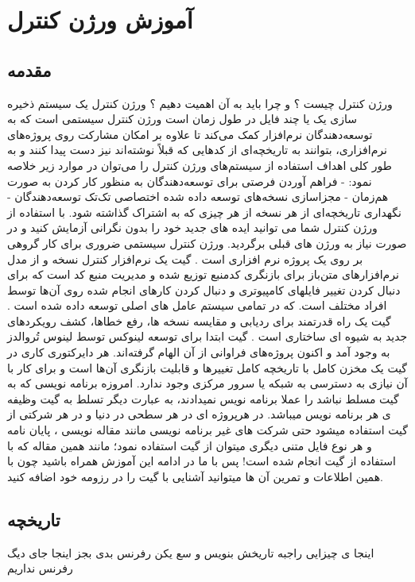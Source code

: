 \chapter{آموزش ورژن کنترل}




\section{مقدمه}
ورژن کنترل چیست ؟ و چرا باید به آن اهمیت دهیم ؟ ورژن کنترل یک سیستم ذخیره سازی یک یا چند فایل در طول زمان است \cite{Blischak2016} ورژن کنترل سیستمی است که به توسعه‌دهندگان نرم‌افزار کمک می‌کند تا علاوه بر امکان مشارکت روی پروژه‌های نرم‌افزاری، بتوانند به تاریخچه‌ای از کدهایی که قبلاً نوشته‌اند نیز دست پیدا کنند و به طور کلی اهداف استفاده از سیستم‌های ورژن کنترل را می‌توان در موارد زیر خلاصه نمود:
- فراهم آوردن فرصتی برای توسعه‌دهندگان به منظور کار کردن به صورت هم‌زمان 
- مجزاسازی نسخه‌های توسعه داده شده اختصاصی تک‌تک توسعه‌دهندگان 
- نگهداری تاریخچه‌ای از هر نسخه از هر چیزی که به اشتراک گذاشته شود.
با استفاده از ورژن کنترل شما می توانید ایده های جدید خود را بدون نگرانی آزمایش کنید و در صورت نیاز به ورژن های قبلی برگردید\cite{Chacon2014}. ورژن کنترل سیستمی ضروری برای کار گروهی بر روی یک پروژه نرم افزاری است \cite{DeAlwis2009} . 
گیت یک نرم‌افزار کنترل نسخه و از مدل نرم‌افزارهای متن‌باز برای بازنگری کدمنبع توزیع شده و مدیریت منبع کد است که برای دنبال کردن تغییر فایلهای کامپیوتری و دنبال کردن کارهای انجام شده روی آن‌ها توسط افراد مختلف است. که در تمامی سیستم عامل های اصلی توسعه داده شده است \cite{Ram2013} . گیت یک راه قدرتمند برای ردیابی و مقایسه نسخه ها، رفع خطاها، کشف رویکردهای جدید به شیوه ای ساختاری است\cite{spinellis2012git} .
گیت ابتدا برای توسعه لینوکس توسط لینوس تُروالدز به وجود آمد و اکنون پروژه‌های فراوانی از آن الهام گرفته‌اند. هر دایرکتوری کاری در گیت یک مخزن کامل با تاریخچه کامل تغییرها و قابلیت بازنگری آن‌ها است و برای کار با آن نیازی به دسترسی به شبکه یا سرور مرکزی وجود ندارد.
امروزه برنامه نویسی که به گیت مسلط نباشد را عملا برنامه نویس نمیدادند، به عبارت دیگر تسلط به گیت وظیفه ی هر برنامه نویس میباشد. در هرپروژه ای در هر سطحی در دنیا و در هر شرکتی از گیت استفاده میشود حتی شرکت های غیر برنامه نویسی مانند مقاله نویسی ، پایان نامه و هر نوع فایل متنی دیگری میتوان از گیت استفاده نمود؛ مانند همین مقاله که با استفاده از گیت انجام شده است! پس با ما در ادامه این آموزش همراه باشید چون با همین اطلاعات و تمرین آن ها میتوانید آشنایی با گیت را در رزومه خود اضافه کنید.

\newpage

\section{تاریخچه}
اینجا ی چیزایی راجبه تاریخش بنویس و سع یکن رفرنس بدی بجز اینجا جای دیگ رفرنس نداریم 
